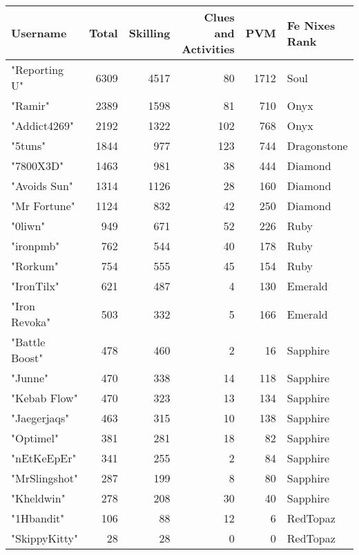 \documentclass{article}
\begin{document}
\begin{table}[htbp]
\centering
{}
\begin{tabular}{|l|r|r|r|r|l|}
\hline
\textbf{Username} & \textbf{Total} & \textbf{Skilling} & \textbf{Clues and Activities} & \textbf{PVM} & \textbf{Fe Nixes Rank} \\ \hline
"Reporting U" & 6309 & 4517 & 80 & 1712 & Soul \\ \hline
"Ramir" & 2389 & 1598 & 81 & 710 & Onyx \\ \hline
"Addict4269" & 2192 & 1322 & 102 & 768 & Onyx \\ \hline
"5tuns" & 1844 & 977 & 123 & 744 & Dragonstone \\ \hline
"7800X3D" & 1463 & 981 & 38 & 444 & Diamond \\ \hline
"Avoids Sun" & 1314 & 1126 & 28 & 160 & Diamond \\ \hline
"Mr Fortune" & 1124 & 832 & 42 & 250 & Diamond \\ \hline
"0liwn" & 949 & 671 & 52 & 226 & Ruby \\ \hline
"ironpmb" & 762 & 544 & 40 & 178 & Ruby \\ \hline
"Rorkum" & 754 & 555 & 45 & 154 & Ruby \\ \hline
"IronTilx" & 621 & 487 & 4 & 130 & Emerald \\ \hline
"Iron Revoka" & 503 & 332 & 5 & 166 & Emerald \\ \hline
"Battle Boost" & 478 & 460 & 2 & 16 & Sapphire \\ \hline
"Junne" & 470 & 338 & 14 & 118 & Sapphire \\ \hline
"Kebab Flow" & 470 & 323 & 13 & 134 & Sapphire \\ \hline
"Jaegerjaqs" & 463 & 315 & 10 & 138 & Sapphire \\ \hline
"Optimel" & 381 & 281 & 18 & 82 & Sapphire \\ \hline
"nEtKeEpEr" & 341 & 255 & 2 & 84 & Sapphire \\ \hline
"MrSlingshot" & 287 & 199 & 8 & 80 & Sapphire \\ \hline
"Kheldwin" & 278 & 208 & 30 & 40 & Sapphire \\ \hline
"1Hbandit" & 106 & 88 & 12 & 6 & RedTopaz \\ \hline
"SkippyKitty" & 28 & 28 & 0 & 0 & RedTopaz \\ \hline
\end{tabular}
\end{table}
\end{document}
